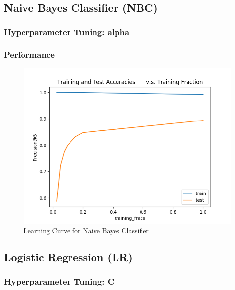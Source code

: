 \documentclass{sig-alternate-05-2015}
\begin{document}
\subsection{Naive Bayes Classifier (NBC)}
\subsubsection{Hyperparameter Tuning: alpha}

\subsubsection{Performance}
\begin{figure}[H]
\centering
\includegraphics[width=\linewidth]{plots/learning_curve_nbc.png}
\caption{Learning Curve for Naive Bayes Classifier}
\end{figure}

\subsection{Logistic Regression (LR)}
\subsubsection{Hyperparameter Tuning: C}
\end{document}
